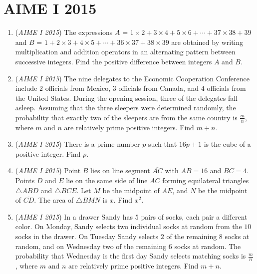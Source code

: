 \section{AIME I 2015}
        \begin{enumerate}
        	\item (\textit{AIME I 2015}) The expressions $A$ = $1 \times 2 + 3 \times 4 + 5 \times 6 + \cdots + 37 \times 38 + 39$ and $B$ = $1 + 2 \times 3 + 4 \times 5 + \cdots + 36 \times 37 + 38 \times 39$ are obtained by writing multiplication and addition operators in an alternating pattern between successive integers.  Find the positive difference between integers $A$ and $B$.


 



 

	\item (\textit{AIME I 2015}) The nine delegates to the Economic Cooperation Conference include $2$ officials from Mexico, $3$ officials from Canada, and $4$ officials from the United States. During the opening session, three of the delegates fall asleep. Assuming that the three sleepers were determined randomly, the probability that exactly two of the sleepers are from the same country is $\frac{m}{n}$, where $m$ and $n$ are relatively prime positive integers. Find $m+n$.


 



 

	\item (\textit{AIME I 2015}) There is a prime number $p$ such that $16p+1$ is the cube of a positive integer.  Find $p$.


 



 

	\item (\textit{AIME I 2015}) Point $B$ lies on line segment $\overline{AC}$ with $AB=16$ and $BC=4$. Points $D$ and $E$ lie on the same side of line $AC$ forming equilateral triangles $\triangle ABD$ and $\triangle BCE$. Let $M$ be the midpoint of $\overline{AE}$, and $N$ be the midpoint of $\overline{CD}$. The area of $\triangle BMN$ is $x$. Find $x^2$.


 



 

	\item (\textit{AIME I 2015}) In a drawer Sandy has $5$ pairs of socks, each pair a different color.  On Monday, Sandy selects two individual socks at random from the $10$ socks in the drawer.  On Tuesday Sandy selects $2$ of the remaining $8$ socks at random, and on Wednesday two of the remaining $6$ socks at random.  The probability that Wednesday is the first day Sandy selects matching socks is $\frac{m}{n}$, where $m$ and $n$ are relatively prime positive integers. Find $m+n$.



\end{enumerate}
